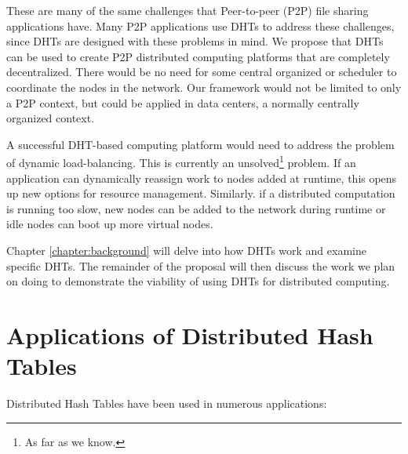 These are many of the same challenges that Peer-to-peer (P2P) file sharing applications have.
Many P2P applications use DHTs to address these challenges, since DHTs are designed with these problems in mind.
We propose that DHTs can be used to create P2P distributed computing platforms that are completely decentralized.
There would be no need for some central organized or scheduler to coordinate the nodes in the network.
Our framework would not be limited to only a P2P context, but could be applied in data centers, a normally centrally organized context.


A successful DHT-based computing platform would need to address the problem of dynamic load-balancing.
This is currently an unsolved\footnote{As far as we know.} problem. %
If an application can dynamically reassign work to nodes added at runtime, this opens up new options for resource management.
Similarly. if a distributed computation  is running too slow, new nodes can be added to the network during runtime or idle nodes can boot up more virtual nodes. %

Chapter \ref{chapter:background} will delve into how DHTs work and examine specific DHTs.
The remainder of the proposal will then discuss the work we plan on doing to demonstrate the viability of using DHTs for distributed computing.




\section{Applications of Distributed Hash Tables}

Distributed Hash Tables have been used in numerous applications:

